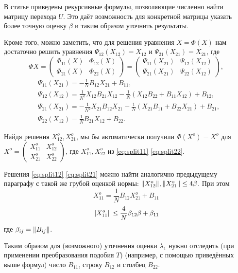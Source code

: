 В статье приведены рекурсивные формулы, позволяющие численно найти матрицу перехода \( U \).
Это даёт возможность для конкретной матрицы указать более точную оценку \( \beta \) и таким образом уточнить результаты.

Кроме того, можно заметить, что для решения уравнения \( X = \Phi(X) \)
нам достаточно решить уравнения \( \Psi_{12}(X_{12}) = X_{12} \) и \( \Psi_{21}(X_{21}) = X_{21} \),
где
\[
    \Phi X =
    \begin{pmatrix}
        \Phi_{11}(X) & \Phi_{12}(X) \\
        \Phi_{21}(X) & \Phi_{22}(X)
    \end{pmatrix} =
    \begin{pmatrix}
        \Psi_{11}(X_{21}) & \Psi_{12}(X_{12}) \\
        \Psi_{21}(X_{21}) & \Psi_{22}(X_{12})
    \end{pmatrix},
\]
\begin{subequations}
    \begin{align}
        \label{eq:split11}
        & \Psi_{11}(X_{21}) = -\frac1N B_{12}X_{21} + B_{11}, \\
        \label{eq:split12}
        & \Psi_{12}(X_{12}) = \frac{1}{N^2} X_{12}B_{21}X_{12} -
                                   \frac1N\left(X_{12}B_{22} +
                                   B_{11}X_{12}\right) + B_{12}, \\
        \label{eq:split21}
        & \Psi_{21}(X_{21}) = -\frac{1}{N^2} X_{21}B_{12}X_{21} -
                                   \frac1N\left(X_{21}B_{11} +
                                   B_{22}X_{21}\right) +
                                   B_{21}, \\
        \label{eq:split22}
        & \Psi_{22}(X_{12}) = \frac1N B_{21}X_{12} + B_{22}.
    \end{align}
\end{subequations}

Найдя решения \( X_{12}^o, X_{21}^o \),
мы бы автоматически получили
\( \Phi(X^o) = X^o \) для
\( X^o =
\left(\begin{smallmatrix}
    X_{11}^o & X_{12}^o \\
    X_{21}^o & X_{22}^o
\end{smallmatrix}\right) \),
где \( X_{11}^o, X_{22}^o \) из \eqref{eq:split11} \eqref{eq:split22}.

Решения \eqref{eq:split12} \eqref{eq:split21} можно найти аналогично предыдущему параграфу
с такой же грубой оценкой нормы: \( {\left\|{X_{12}^o}\right\|}, {\left\|{X_{21}^o}\right\|} \leq 4\beta \).
При этом
\[ X_{11}^o = \frac1N B_{12} X_{21}^o + B_{11} \]
\[ {\left\|{X_{11}^o}\right\|} \leq \frac4N \beta_{12}\beta + \beta_{11} \]
где \( \beta_{ij} = {\left\|{B_{ij}}\right\|} \).

Таким образом для (возможного) уточнения оценки \( \lambda_1 \)
нужно отследить (при применении преобразования подобия \( T \)) (например, с помощью приведённых выше формул)
число \( B_{11} \), строку \( B_{12} \) и столбец \( B_{22} \).
